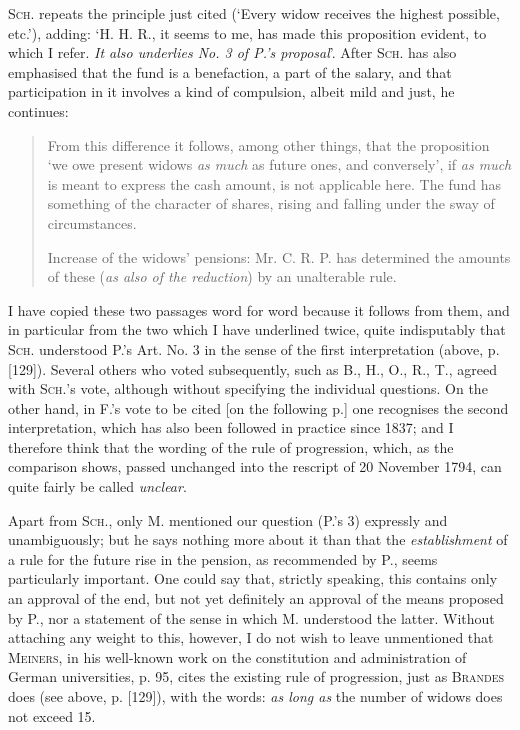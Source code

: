 \textsc{Sch.} repeats the principle just cited (‘Every widow receives the highest possible, etc.’), adding: ‘H. H. R., it seems to me, has made this proposition evident, to which I refer. \textit{It also underlies No. 3 of P.'s proposal}’. After \textsc{Sch.} has also emphasised that the fund is a benefaction, a part of the salary, and that participation in it involves a kind of compulsion, albeit mild and just, he continues:
\begin{quote}
From this difference it follows, among other things, that the proposition ‘we owe present widows \textit{as much} as future ones, and conversely’, if \textit{as much} is meant to express the cash amount, is not applicable here. The fund has something of the character of shares, rising and falling under the sway of circumstances.

Increase of the widows' pensions: Mr. C. R. P. has determined the amounts of these (\textit{as also of the reduction}) by an unalterable rule.
\end{quote}
\noindent I have copied these two passages word for word because it follows from them, and in particular from the two which I have underlined twice, quite indisputably that \textsc{Sch.} understood P.'s Art. No. 3 in the sense of the first interpretation (above, p. [129]). Several others who voted subsequently, such as B., H., O., R., T., agreed with \textsc{Sch.}'s vote, although without specifying the individual questions. On the other hand, in F.'s vote to be cited [on the following p.] one recognises the second interpretation, which has also been followed in practice since 1837; and I therefore think that the wording of the rule of progression, which, as the comparison shows, passed unchanged into the rescript of 20 November 1794, can quite fairly be called \textit{unclear}.

Apart from \textsc{Sch.}, only M. mentioned our question (P.'s 3) expressly and unambiguously; but he says nothing more about it than that the \textit{establishment} of a rule for the future rise in the pension, as recommended by P., seems particularly important. One could say that, strictly speaking, this contains only an approval of the end, but not yet definitely an approval of the means proposed by P., nor a statement of the sense in which M. understood the latter. Without attaching any weight to this, however, I do not wish to leave unmentioned that \textsc{Meiners}, in his well-known work on the constitution and administration of German universities, p. 95, cites the existing rule of progression, just as \textsc{Brandes} does (see above, p. [129]), with the words: \textit{as long as} the number of widows does not exceed 15.

